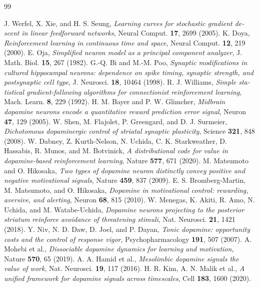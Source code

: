 \begin{thebibliography}{99}
\begin{otherlanguage}{english}
 J. Werfel, X. Xie, and H. S. Seung, \emph{Learning curves for stochastic gradient descent in linear feedforward networks}, Neural Comput. \textbf{17}, 2699 (2005).
 K. Doya, \emph{Reinforcement learning in continuous time and space}, Neural Comput. \textbf{12}, 219 (2000).
 E. Oja, \emph{Simplified neuron model as a principal component analyzer}, J. Math. Biol. \textbf{15}, 267 (1982).
 G.-Q. Bi and M.-M. Poo, \emph{Synaptic modifications in cultured hippocampal neurons: dependence on spike timing, synaptic strength, and postsynaptic cell type}, J. Neurosci. \textbf{18}, 10464 (1998).
 R. J. Williams, \emph{Simple statistical gradient-following algorithms for connectionist reinforcement learning}, Mach. Learn. \textbf{8}, 229 (1992).
 H. M. Bayer and P. W. Glimcher, \emph{Midbrain dopamine neurons encode a quantitative reward prediction error signal}, Neuron \textbf{47}, 129 (2005).
 W. Shen, M. Flajolet, P. Greengard, and D. J. Surmeier, \emph{Dichotomous dopaminergic control of striatal synaptic plasticity}, Science \textbf{321}, 848 (2008).
 W. Dabney, Z. Kurth-Nelson, N. Uchida, C. K. Starkweather, D. Hassabis, R. Munos, and M. Botvinick, \emph{A distributional code for value in dopamine-based reinforcement learning}, Nature \textbf{577}, 671 (2020).
 M. Matsumoto and O. Hikosaka, \emph{Two types of dopamine neuron distinctly convey positive and negative motivational signals}, Nature \textbf{459}, 837 (2009).
 E. S. Bromberg-Martin, M. Matsumoto, and O. Hikosaka, \emph{Dopamine in motivational control: rewarding, aversive, and alerting}, Neuron \textbf{68}, 815 (2010).
 W. Menegas, K. Akiti, R. Amo, N. Uchida, and M. Watabe-Uchida, \emph{Dopamine neurons projecting to the posterior striatum reinforce avoidance of threatening stimuli}, Nat. Neurosci. \textbf{21}, 1421 (2018).
 Y. Niv, N. D. Daw, D. Joel, and P. Dayan, \emph{Tonic dopamine: opportunity costs and the control of response vigor}, Psychopharmacology \textbf{191}, 507 (2007).
 A. Mohebi et al., \emph{Dissociable dopamine dynamics for learning and motivation}, Nature \textbf{570}, 65 (2019).
 A. A. Hamid et al., \emph{Mesolimbic dopamine signals the value of work}, Nat. Neurosci. \textbf{19}, 117 (2016).
 H. R. Kim, A. N. Malik et al., \emph{A unified framework for dopamine signals across timescales}, Cell \textbf{183}, 1600 (2020).

\end{otherlanguage}
\end{thebibliography}
